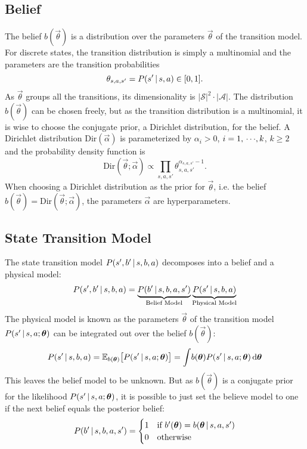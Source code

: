 		\subsection{Belief}
			The belief \(b(\vec{\theta})\) is a distribution over the parameters \(\vec{\theta}\) of the transition model. For discrete states, the transition distribution is simply a multinomial and the parameters are the transition probabilities
			\begin{equation*}
				\theta_{s, a, s'} = P(s' \,\vert\, s, a) \in [0, 1].
			\end{equation*}
			As \(\vec{\theta}\) groups all the transitions, its dimensionality is \( \lvert \mathcal{S} \rvert^2 \cdot \lvert \mathcal{A} \rvert \). The distribution \( b(\vec{\theta}) \) can be chosen freely, but as the transition distribution is a multinomial, it is wise to choose the conjugate prior, a Dirichlet distribution, for the belief. A Dirichlet distribution \( \mathrm{Dir}(\vec{\alpha}) \) is parameterized by \( \alpha_i > 0 \), \( i = 1,\,\cdots\!,k \), \( k \geq 2 \) and the probability density function is
			\begin{equation*}
				\mathrm{Dir}(\vec{\theta}; \vec{\alpha}) \propto \prod_{s, a, s'} \theta_{s, a, s'}^{\alpha_{s, a, s'} - 1}.
			\end{equation*}
			When choosing a Dirichlet distribution as the prior for \( \vec{\theta} \), i.e. the belief \( b(\vec{\theta}) = \mathrm{Dir}(\vec{\theta}; \vec{\alpha}) \), the parameters \( \vec{\alpha} \) are hyperparameters.

		\subsection{State Transition Model}
			The state transition model \( P(s', b' \,\vert\, s, b, a) \) decomposes into a belief and a physical model:
			\begin{equation*}
				P(s', b' \,\vert\, s, b, a) = \underbrace{P(b' \,\vert\, s, b, a, s')}_\text{Belief Model} \underbrace{P(s' \,\vert\, s, b, a)}_\text{Physical Model}
			\end{equation*}
			The physical model is known as the parameters \(\vec{\theta}\) of the transition model \( P(s' \,\vert\, s, a; \bm{\theta}) \) can be integrated out over the belief \( b(\vec{\theta}) \):
			\begin{equation*}
				P(s' \,\vert\, s, b, a) = \mathbb{E}_{b(\bm{\theta})}\big[ P(s' \,\vert\, s, a; \bm{\theta}) \big] = \int\! b(\bm{\theta}) P(s' \,\vert\, s, a; \bm{\theta}) \dd{\bm{\theta}}
			\end{equation*}
			This leaves the belief model to be unknown. But as \(b(\vec{\theta})\) is a conjugate prior for the likelihood \( P(s' \,\vert\, s, a; \bm{\theta}) \), it is possible to just set the believe model to one if the next belief equals the posterior belief:
			\begin{equation*}
				P(b' \,\vert\, s, b, a, s') =
				\begin{cases}
					1 & \text{if } b'(\bm{\theta}) = b(\bm{\theta} \,\vert\, s, a, s') \\
					0 & \text{otherwise}
				\end{cases}
			\end{equation*}

